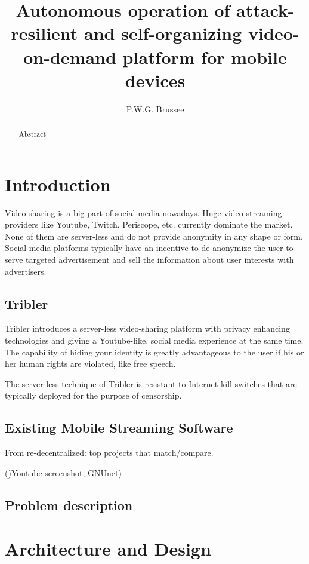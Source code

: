 \documentclass[]{report}
\title{Autonomous operation of attack-resilient and self-organizing video-on-demand  platform for mobile devices}
\author{P.W.G. Brussee}
\begin{document}
\maketitle

\begin{abstract}
	Abstract
\end{abstract}


\chapter{Introduction}

Video sharing is a big part of social media nowadays.
Huge video streaming providers like Youtube, Twitch, Periscope, etc. currently dominate the market.
None of them are server-less and do not  provide anonymity in any shape or form.
Social media platforms typically have an incentive to de-anonymize the user to serve targeted advertisement and sell the information about user interests with advertisers.

\section{Tribler}
Tribler introduces a server-less video-sharing platform with privacy enhancing technologies and giving a Youtube-like, social media experience at the same time.
The capability of hiding your identity is greatly advantageous to the user if his or her human rights are violated, like free speech.

The server-less technique of Tribler is resistant to Internet kill-switches that are typically deployed for the purpose of censorship.


\section{Existing Mobile Streaming Software}
From re-decentralized: top projects that match/compare.

()Youtube screenshot, GNUnet)




\section{Problem description}




\chapter{Architecture and Design}
\end{document}
